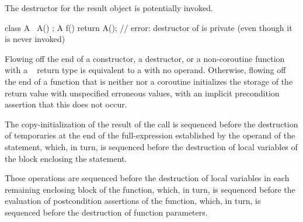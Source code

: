 \pnum
The destructor for the result object
is potentially invoked.
\begin{example}
\begin{codeblock}
class A {
  ~A() {}
};
A f() { return A(); }   // error: destructor of  is private (even though it is never invoked)
\end{codeblock}
\end{example}

\pnum
Flowing off the end of
a constructor,
a destructor, or
a non-coroutine function with a \cv{}~ return type is
equivalent to a  with no operand.
Otherwise, flowing off the end of a function
that is neither  nor a coroutine
initializes the storage
of the return value
with unspecified erroneous values,
with an implicit precondition assertion
that this does not occur.
%
%
%
%
%

\pnum
The copy-initialization of the result of the call is sequenced before the
destruction of temporaries at the end of the full-expression established
by the operand of the  statement, which, in turn, is sequenced
before the destruction of local variables of the block
enclosing the  statement.
\begin{note}
These operations
are sequenced before the destruction of local variables
in each remaining enclosing block of the function,
which, in turn,
is sequenced before the evaluation of
postcondition assertions of the function,
which, in turn,
is sequenced before the destruction of function parameters.
\end{note}

